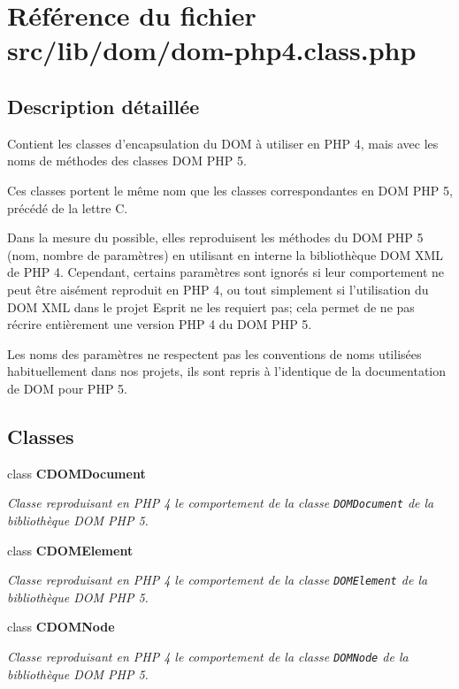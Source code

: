 \section{Référence du fichier src/lib/dom/dom-php4.class.php}
\label{dom-php4_8class_8php}


\subsection{Description détaillée}
Contient les classes d'encapsulation du DOM à utiliser en PHP 4, mais avec les noms de méthodes des classes DOM PHP 5. 

Ces classes portent le même nom que les classes correspondantes en DOM PHP 5, précédé de la lettre C.

Dans la mesure du possible, elles reproduisent les méthodes du DOM PHP 5 (nom, nombre de paramètres) en utilisant en interne la bibliothèque DOM XML de PHP 4. Cependant, certains paramètres sont ignorés si leur comportement ne peut être aisément reproduit en PHP 4, ou tout simplement si l'utilisation du DOM XML dans le projet Esprit ne les requiert pas; cela permet de ne pas récrire entièrement une version PHP 4 du DOM PHP 5.

Les noms des paramètres ne respectent pas les conventions de noms utilisées habituellement dans nos projets, ils sont repris à l'identique de la documentation de DOM pour PHP 5. 

\subsection*{Classes}
\begin{CompactItemize}
\item 
class {\bf CDOMDocument}
\begin{CompactList}\small\item\em Classe reproduisant en PHP 4 le comportement de la classe {\tt DOMDocument} de la bibliothèque DOM PHP 5. \item\end{CompactList}\item 
class {\bf CDOMElement}
\begin{CompactList}\small\item\em Classe reproduisant en PHP 4 le comportement de la classe {\tt DOMElement} de la bibliothèque DOM PHP 5. \item\end{CompactList}\item 
class {\bf CDOMNode}
\begin{CompactList}\small\item\em Classe reproduisant en PHP 4 le comportement de la classe {\tt DOMNode} de la bibliothèque DOM PHP 5. \item\end{CompactList}\end{CompactItemize}
